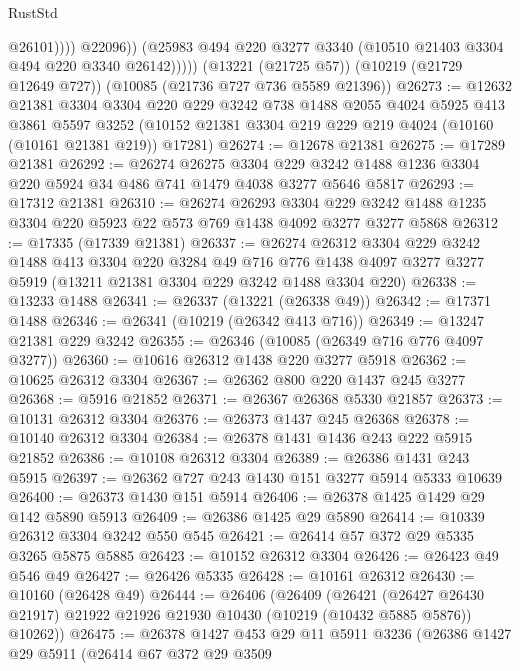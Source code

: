 \begin{lexlean}{RustStd}
\begin{coremodule}
                      @26101))))
              @22096))
          (@25983 @494 @220 @3277 @3340 (@10510 @21403 @3304 @494 @220 @3340 @26142)))))
    (@13221 (@21725 @57))
    (@10219 (@21729 @12649 @727))
    (@10085 (@21736 @727 @736 @5589 @21396))
@26273 := @12632
    @21381
    @3304
    @3304
    @220
    @229
    @3242
    @738
    @1488
    @2055
    @4024
    @5925
    @413
    @3861
    @5597
    @3252
    (@10152 @21381 @3304 @219 @229 @219 @4024 (@10160 (@10161 @21381 @219)) @17281)
@26274 := @12678 @21381
@26275 := @17289 @21381
@26292 := @26274
    @26275
    @3304
    @229
    @3242
    @1488
    @1236
    @3304
    @220
    @5924
    @34
    @486
    @741
    @1479
    @4038
    @3277
    @5646
    @5817
@26293 := @17312 @21381
@26310 := @26274
    @26293
    @3304
    @229
    @3242
    @1488
    @1235
    @3304
    @220
    @5923
    @22
    @573
    @769
    @1438
    @4092
    @3277
    @3277
    @5868
@26312 := @17335 (@17339 @21381)
@26337 := @26274
    @26312
    @3304
    @229
    @3242
    @1488
    @413
    @3304
    @220
    @3284
    @49
    @716
    @776
    @1438
    @4097
    @3277
    @3277
    @5919
    (@13211 @21381 @3304 @229 @3242 @1488 @3304 @220)
@26338 := @13233 @1488
@26341 := @26337 (@13221 (@26338 @49))
@26342 := @17371 @1488
@26346 := @26341 (@10219 (@26342 @413 @716))
@26349 := @13247 @21381 @229 @3242
@26355 := @26346 (@10085 (@26349 @716 @776 @4097 @3277))
@26360 := @10616 @26312 @1438 @220 @3277 @5918
@26362 := @10625 @26312 @3304
@26367 := @26362 @800 @220 @1437 @245 @3277
@26368 := @5916 @21852
@26371 := @26367 @26368 @5330 @21857
@26373 := @10131 @26312 @3304
@26376 := @26373 @1437 @245 @26368
@26378 := @10140 @26312 @3304
@26384 := @26378 @1431 @1436 @243 @222 @5915 @21852
@26386 := @10108 @26312 @3304
@26389 := @26386 @1431 @243 @5915
@26397 := @26362 @727 @243 @1430 @151 @3277 @5914 @5333 @10639
@26400 := @26373 @1430 @151 @5914
@26406 := @26378 @1425 @1429 @29 @142 @5890 @5913
@26409 := @26386 @1425 @29 @5890
@26414 := @10339 @26312 @3304 @3242 @550 @545
@26421 := @26414 @57 @372 @29 @5335 @3265 @5875 @5885
@26423 := @10152 @26312 @3304
@26426 := @26423 @49 @546 @49
@26427 := @26426 @5335
@26428 := @10161 @26312
@26430 := @10160 (@26428 @49)
@26444 := @26406
    (@26409
      (@26421
        (@26427 @26430 @21917)
        @21922
        @21926
        @21930
        @10430
        (@10219 (@10432 @5885 @5876))
        @10262))
@26475 := @26378
    @1427
    @453
    @29
    @11
    @5911
    @3236
    (@26386
      @1427
      @29
      @5911
      (@26414
        @67
        @372
        @29
        @3509

\end{coremodule}
\end{lexlean}
